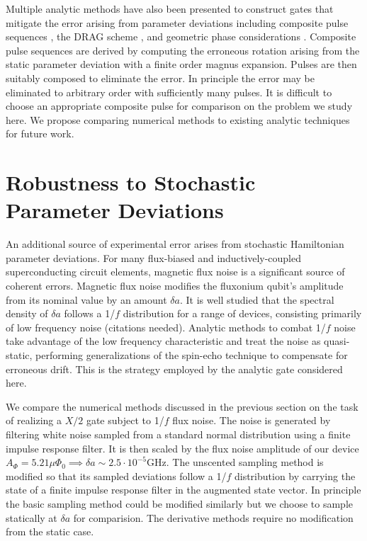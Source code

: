 \documentclass[
  amsfonts,
  amsmath,
  tbtags,
  amssymb,
  aps,
  nobibnotes,
  twocolumn,
  superscriptaddress,
]{revtex4-2}
\begin{document}
Multiple analytic methods have also been presented to construct gates
that mitigate the error arising from parameter deviations
including composite pulse sequences \cite{merrill2014progress},
the DRAG scheme \cite{krantz2019quantum}, and
geometric phase considerations
\cite{xu2020nonadiabatic, han2020experimental}.
Composite pulse sequences are derived by computing
the erroneous rotation arising from the static parameter deviation
with a finite order magnus expansion.
Pulses are then suitably composed to eliminate the
error. In principle the error may be eliminated
to arbitrary order with sufficiently many pulses.
It is difficult to choose an appropriate composite pulse
for comparison on the problem we study here. We
propose comparing numerical methods to existing analytic
techniques for future work.


\section{Robustness to Stochastic Parameter Deviations}
An additional source of experimental error arises from stochastic
Hamiltonian parameter deviations. For many flux-biased and inductively-coupled
superconducting circuit elements, magnetic flux noise is a significant
source of coherent errors. Magnetic flux noise
modifies the fluxonium qubit's amplitude from its nominal value by an amount $\delta a$.
It is well studied that the spectral density of $\delta a$ follows a
1/$f$ distribution for a range of devices, consisting primarily of low frequency
noise (citations needed). Analytic methods to combat 1/$f$ noise
take advantage of the low frequency characteristic and
treat the noise as quasi-static, performing generalizations of the spin-echo technique
to compensate for erroneous drift. This is the strategy employed by the analytic gate
considered here.

We compare the numerical methods discussed in the previous section
on the task of realizing a $X/2$ gate subject to 1/$f$ flux noise.
The noise is generated by
filtering white noise sampled from a standard normal distribution using a finite
impulse response filter. It is then scaled by the 
flux noise amplitude of our device $A_{\Phi} = 5.21 \mu \Phi_{0} \implies
\delta a \sim 2.5 \cdot 10^{-5} \textrm{GHz}$.
The unscented sampling method is modified so that its sampled deviations
follow a 1/$f$ distribution by carrying the state of a finite impulse response filter
in the augmented state vector. In principle the basic sampling method could be modified
similarly but we choose to sample statically at $\delta a$ for comparision. The derivative
methods require no modification from the static case.
\end{document}
